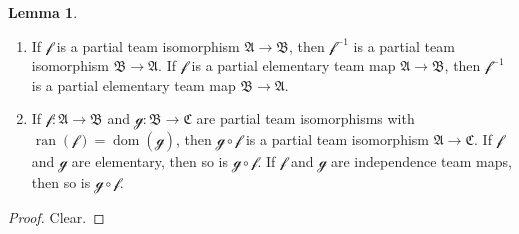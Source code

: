 \documentclass[a4paper]{amsart}
\theoremstyle{definition}
\newtheorem{lemma}[definition]{Lemma}
\theoremstyle{remark}
\newcommand{\A}{\mathcal{A}}
\newcommand{\B}{\mathcal{B}}
\newcommand{\C}{\mathcal{C}}
\DeclareMathOperator{\dom}{dom}
\DeclareMathOperator{\ran}{ran}
\theoremstyle{definition}
\renewcommand{\A}{\mathfrak{A}}
\renewcommand{\B}{\mathfrak{B}}
\renewcommand{\C}{\mathfrak{C}}
\newcommand{\f}{\mathcal{f}}
\newcommand{\g}{\mathcal{g}}
\begin{document}
\begin{lemma}\quad
    \begin{enumerate}
        \item If $\f$ is a partial team isomorphism $\A\to\B$, then $\f^{-1}$ is a partial team isomorphism $\B\to\A$. If $\f$ is a partial elementary team map $\A\to\B$, then $\f^{-1}$ is a partial elementary team map $\B\to\A$.
        \item If $\f\colon\A\to\B$ and $\g\colon\B\to\C$ are partial team isomorphisms with $\ran(\f) = \dom(\g)$, then $\g\circ\f$ is a partial team isomorphism $\A\to\C$. If $\f$ and $\g$ are elementary, then so is $\g\circ\f$. If $\f$ and $\g$ are independence team maps, then so is $\g\circ\f$.
    \end{enumerate}
\end{lemma}
\begin{proof}
    Clear. \qedhere
\end{proof}
\end{document}
